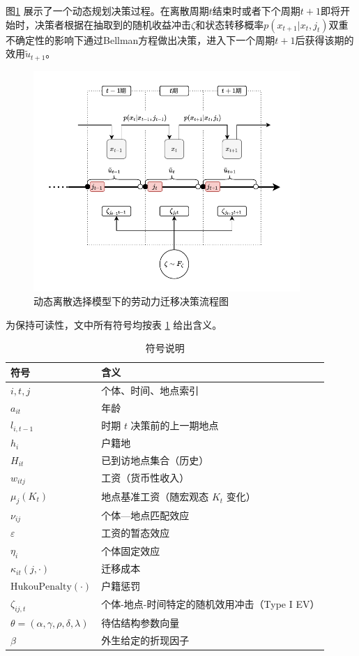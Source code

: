 \documentclass[master, final]{zufe-thesis}
\begin{document}
图\ref{fig:migration_flow_resized2} 展示了一个动态规划决策过程。在离散周期$t$结束时或者下个周期$t+1$即将开始时，决策者根据在抽取到的随机收益冲击$\zeta$和状态转移概率$p(x_{t+1}|x_t,j_t)$双重不确定性的影响下通过Bellman方程做出决策，进入下一个周期$t+1$后获得该期的效用$\tilde u_{t+1}$。

\begin{figure}[!ht]
\centering
\includegraphics[width=0.9\textwidth]{images/dynamicsequence2.drawio.pdf}
\caption{动态离散选择模型下的劳动力迁移决策流程图}
\label{fig:migration_flow_resized2}
\end{figure}


为保持可读性，文中所有符号均按表 \ref{tab:notation} 给出含义。
\begin{table}[ht]
\centering
\caption{符号说明}\label{tab:notation}
\begin{tabularx}{\textwidth}{lX}
\toprule
符号 & 含义 \\
\midrule
$i,t,j$ & 个体、时间、地点索引 \\
$a_{it}$ & 年龄 \\
$l_{i,t-1}$ & 时期 $t$ 决策前的上一期地点 \\
$h_i$ & 户籍地 \\
$H_{it}$ & 已到访地点集合（历史） \\
$w_{itj}$ & 工资（货币性收入） \\
$\mu_j(K_t)$ & 地点基准工资（随宏观态 $K_t$ 变化）\\
$\nu_{ij}$ & 个体—地点匹配效应\\
$\varepsilon$ & 工资的暂态效应\\
    $\eta_i$ & 个体固定效应 \\
    $\kappa_{it}(j,\cdot)$ & 迁移成本 \\
    $\mathrm{HukouPenalty}(\cdot)$ & 户籍惩罚 \\
    $\zeta_{ij,t}$ & 个体-地点-时间特定的随机效用冲击（Type I EV） \\
    $\theta=(\alpha, \gamma,\rho, \delta, \lambda)$ & 待估结构参数向量\\
    $\beta$ & 外生给定的折现因子 \\
\bottomrule
\end{tabularx}
\end{table}
\end{document}
